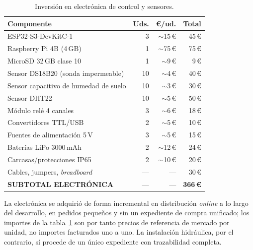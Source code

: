 \begin{table}[H]
    \centering
    \caption{Inversi\'on en electr\'onica de control y sensores.}
    \label{tab:hardware}
    \begin{tabular}{lrrr}
        \toprule
        \textbf{Componente} & \textbf{Uds.} & \textbf{\textbf{\euro}/ud.} & \textbf{Total} \\
        \midrule
        ESP32-S3-DevKitC-1                      & 3   & $\sim$15\,\euro  & 45\,\euro \\
        Raspberry Pi 4B (4\,GB)                 & 1   & $\sim$75\,\euro  & 75\,\euro \\
        MicroSD 32\,GB clase 10                 & 1   & $\sim$9\,\euro   & 9\,\euro \\
        Sensor DS18B20 (sonda impermeable)      & 10  & $\sim$4\,\euro   & 40\,\euro \\
        Sensor capacitivo de humedad de suelo   & 10  & $\sim$3\,\euro   & 30\,\euro \\
        Sensor DHT22                            & 10  & $\sim$5\,\euro   & 50\,\euro \\
        M\'odulo rel\'e 4 canales               & 3   & $\sim$6\,\euro   & 18\,\euro \\
        Convertidores TTL/USB                   & 2   & $\sim$5\,\euro   & 10\,\euro \\
        Fuentes de alimentaci\'on 5\,V          & 3   & $\sim$5\,\euro   & 15\,\euro \\
        Bater\'ias LiPo 3000\,mAh               & 2   & $\sim$12\,\euro  & 24\,\euro \\
        Carcasas/protecciones IP65              & 2   & $\sim$10\,\euro  & 20\,\euro \\
        Cables, jumpers, \textit{breadboard}    & --- & ---              & 30\,\euro \\
        \midrule
        \textbf{SUBTOTAL ELECTR\'ONICA}         & --- & ---              & \textbf{366\,\euro} \\
        \bottomrule
    \end{tabular}
\end{table}

La electr\'onica se adquiri\'o de forma incremental en distribuci\'on
\textit{online} a lo largo del desarrollo, en pedidos peque\~nos y sin
un expediente de compra unificado; los importes de la
tabla~\ref{tab:hardware} son por tanto precios de referencia de mercado
por unidad, no importes facturados uno a uno. La instalaci\'on
hidr\'aulica, por el contrario, s\'i procede de un \'unico expediente
con trazabilidad completa.

